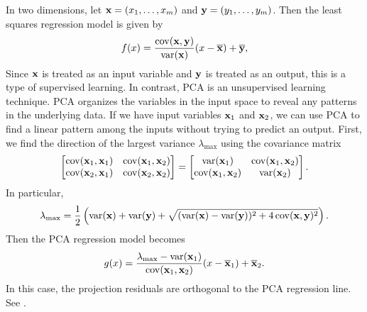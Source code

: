 \begin{example}
    In two dimensions, let \(\mathbf{x} = (x_1, \dots, x_m)\) and \(\mathbf{y} = (y_1, \dots, y_m)\).
    Then the least squares regression model is given by
\begin{equation}
    \label{eqn:ols-model}
    f(x) = \frac{\operatorname{cov}(\mathbf{x},\mathbf{y})}{\operatorname{var}(\mathbf{x})}(x - \overline{\mathbf{x}}) + \overline{\mathbf{y}},
\end{equation}
Since \(\mathbf{x}\) is treated as an input variable and \(\mathbf{y}\) is treated as an output, this is a type of supervised learning.
In contrast, PCA is an unsupervised learning technique.
PCA organizes the variables in the input space to reveal any patterns in the underlying data.
If we have input variables \(\mathbf{x}_1\) and \(\mathbf{x}_2\), we can use PCA to find a linear pattern among the inputs without trying to predict an output.
First, we find the direction of the largest variance \(\lambda_{\max}\) using the covariance matrix
\[\begin{bmatrix}
    \operatorname{cov}(\mathbf{x}_1, \mathbf{x}_1) & \operatorname{cov}(\mathbf{x}_1, \mathbf{x}_2) \\
    \operatorname{cov}(\mathbf{x}_2, \mathbf{x}_1) & \operatorname{cov}(\mathbf{x}_2, \mathbf{x}_2)
\end{bmatrix} = \begin{bmatrix}
    \operatorname{var}(\mathbf{x}_1) & \operatorname{cov}(\mathbf{x}_1, \mathbf{x}_2) \\
    \operatorname{cov}(\mathbf{x}_1, \mathbf{x}_2) & \operatorname{var}(\mathbf{x}_2)
\end{bmatrix}.\]
In particular,
\[\lambda_{\max} = \frac{1}{2}\left(\operatorname{var}(\mathbf{x}) + \operatorname{var}(\mathbf{y}) + \sqrt{(\operatorname{var}(\mathbf{x}) - \operatorname{var}(\mathbf{y}))^2 + 4\operatorname{cov}(\mathbf{x},\mathbf{y})^2}\right).\]
Then the PCA regression model becomes
\begin{equation}
    \label{eqn:pca-model}
    g(x) = \frac{\lambda_{\max} - \operatorname{var}({\mathbf{x}_1})}{\operatorname{cov}(\mathbf{x}_1,\mathbf{x}_2)}(x - \overline{\mathbf{x}}_1) + \overline{\mathbf{x}}_2.
\end{equation}
In this case, the projection residuals are orthogonal to the PCA regression line.
See .


\end{example}
